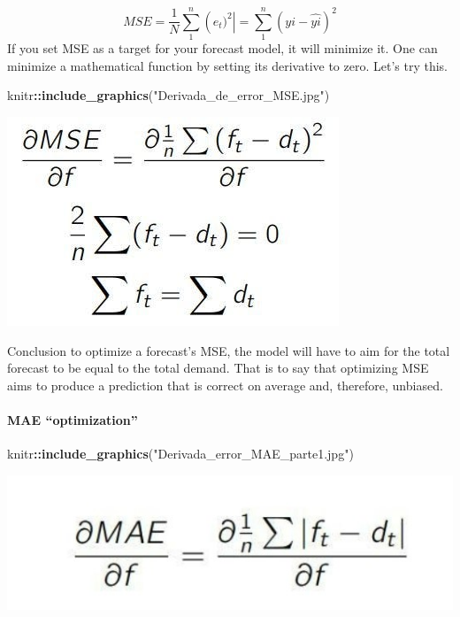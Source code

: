 \documentclass[
]{article}
\newenvironment{Shaded}{\begin{snugshade}}{\end{snugshade}}
\newcommand{\FunctionTok}[1]{\textcolor[rgb]{0.13,0.29,0.53}{\textbf{#1}}}
\newcommand{\NormalTok}[1]{#1}
\newcommand{\SpecialCharTok}[1]{\textcolor[rgb]{0.81,0.36,0.00}{\textbf{#1}}}
\newcommand{\StringTok}[1]{\textcolor[rgb]{0.31,0.60,0.02}{#1}}
\begin{document}
\[ MSE = \frac{1}{N}\sum_{1}^{n}\left (e_{t})^2  \right|=\sum_{1}^{n}\left (yi-\hat{yi} \right)^2 \]
If you set MSE as a target for your forecast model, it will minimize it.
One can minimize a mathematical function by setting its derivative to
zero. Let's try this.

\begin{Shaded}
\begin{Highlighting}[]
\NormalTok{knitr}\SpecialCharTok{::}\FunctionTok{include\_graphics}\NormalTok{(}\StringTok{"Derivada\_de\_error\_MSE.jpg"}\NormalTok{)}
\end{Highlighting}
\end{Shaded}

\includegraphics{Derivada_de_error_MSE.jpg}

Conclusion to optimize a forecast's MSE, the model will have to aim for
the total forecast to be equal to the total demand. That is to say that
optimizing MSE aims to produce a prediction that is correct on average
and, therefore, unbiased.

\hypertarget{mae-optimization}{%
\paragraph{MAE ``optimization''}\label{mae-optimization}}

\begin{Shaded}
\begin{Highlighting}[]
\NormalTok{knitr}\SpecialCharTok{::}\FunctionTok{include\_graphics}\NormalTok{(}\StringTok{"Derivada\_error\_MAE\_parte1.jpg"}\NormalTok{)}
\end{Highlighting}
\end{Shaded}

\includegraphics{Derivada_error_MAE_parte1.jpg}
\end{document}
